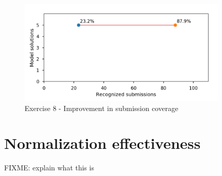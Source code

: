 \begin{figure}
\centering
\includegraphics[height=5cm]{graphs/coverage-8.png}
\caption{Exercise 8 - Improvement in submission coverage}
\label{fig:improvements-coverage-8}
\end{figure}


\section{Normalization effectiveness}

FIXME: explain what this is


